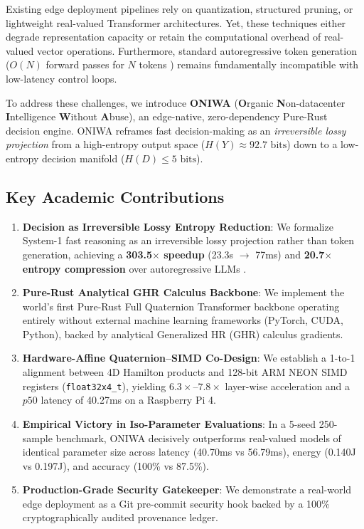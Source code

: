\documentclass[10pt,twocolumn,letterpaper]{article}
\begin{document}
Existing edge deployment pipelines rely on quantization, structured pruning, or lightweight real-valued Transformer architectures. Yet, these techniques either degrade representation capacity or retain the computational overhead of real-valued vector operations. Furthermore, standard autoregressive token generation ($O(N)$ forward passes for $N$ tokens \cite{radford2019language}) remains fundamentally incompatible with low-latency control loops.

To address these challenges, we introduce \textbf{ONIWA} (\textbf{O}rganic \textbf{N}on-datacenter \textbf{I}ntelligence \textbf{W}ithout \textbf{A}buse), an edge-native, zero-dependency Pure-Rust decision engine. ONIWA reframes fast decision-making as an \textit{irreversible lossy projection} from a high-entropy output space ($H(Y) \approx 92.7\text{ bits}$) down to a low-entropy decision manifold ($H(D) \le 5\text{ bits}$). 

\subsection{Key Academic Contributions}
\begin{enumerate}
    \item \textbf{Decision as Irreversible Lossy Entropy Reduction}: We formalize System-1 fast reasoning \cite{kahneman2011} as an irreversible lossy projection rather than token generation, achieving a \textbf{303.5$\times$ speedup} (23.3s $\to$ 77ms) and \textbf{20.7$\times$ entropy compression} over autoregressive LLMs \cite{radford2019language}.
    \item \textbf{Pure-Rust Analytical GHR Calculus Backbone}: We implement the world's first Pure-Rust Full Quaternion Transformer backbone operating entirely without external machine learning frameworks (PyTorch, CUDA, Python), backed by analytical Generalized HR (GHR) calculus gradients.
    \item \textbf{Hardware-Affine Quaternion--SIMD Co-Design}: We establish a 1-to-1 alignment between 4D Hamilton products \cite{hamilton1843} and 128-bit ARM NEON SIMD registers (\texttt{float32x4\_t}), yielding $6.3\times$--$7.8\times$ layer-wise acceleration and a $p50$ latency of 40.27ms on a Raspberry Pi 4.
    \item \textbf{Empirical Victory in Iso-Parameter Evaluations}: In a 5-seed 250-sample benchmark, ONIWA decisively outperforms real-valued models of identical parameter size across latency (40.70ms vs 56.79ms), energy (0.140J vs 0.197J), and accuracy (100\% vs 87.5\%).
    \item \textbf{Production-Grade Security Gatekeeper}: We demonstrate a real-world edge deployment as a Git pre-commit security hook backed by a 100\% cryptographically audited provenance ledger.
\end{enumerate}
\end{document}
